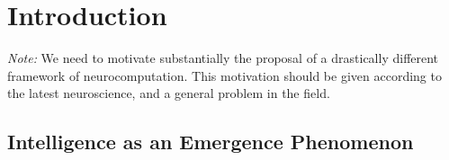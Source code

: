 \section{Introduction}
\emph{Note:} 
We need to motivate substantially the proposal of a drastically different framework of neurocomputation. This motivation should be given according to the latest neuroscience, and a general problem in the field.

\subsection{Intelligence as an Emergence Phenomenon}
